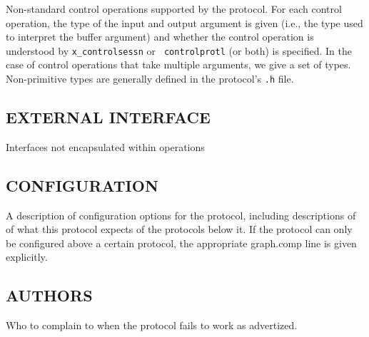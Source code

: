 \noindent 
Non-standard control operations supported by the protocol.  For each
control operation, the type of the input and output argument is given
(i.e., the type used to interpret the buffer argument) and whether the
control operation is understood by {\tt x\_controlsessn} or {\tt
controlprotl} (or both) is specified. In the case of control
operations that take multiple arguments, we give a set of types.
Non-primitive types are generally defined in the protocol's {\tt .h}
file.

\subsection*{EXTERNAL INTERFACE}

Interfaces not encapsulated within \xk{} operations

\subsection*{CONFIGURATION}

\noindent 
A description of configuration options for the protocol, including
descriptions of 
of what this protocol expects of the protocols below it.
If the protocol can only be configured above a certain protocol, the
appropriate graph.comp line is given explicitly.

\subsection*{AUTHORS}

\noindent Who to complain to when the protocol fails to work as advertized.
